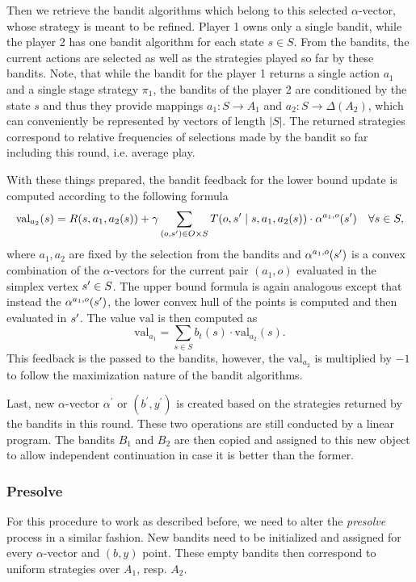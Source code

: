\documentclass[../main.tex]{subfiles}
\begin{document}
Then we retrieve the bandit algorithms which belong to this selected $\alpha$-vector, whose strategy is meant to be refined.
Player 1 owns only a single bandit, while the player 2 has one bandit algorithm for each state $s \in S$.
From the bandits, the current actions are selected as well as the strategies played so far by these bandits.
Note, that while the bandit for the player 1 returns a single action $a_1$ and a single stage strategy $\pi_1$, the bandits of the player 2 are conditioned by the state $s$ and thus they provide mappings $a_1 : S \to A_1$ and $a_2 : S \to \Delta(A_2)$, which can conveniently be represented by vectors of length $|S|$.
The returned strategies correspond to relative frequencies of selections made by the bandit so far including this round, i.e. average play.

With these things prepared, the bandit feedback for the lower bound update is computed according to the following formula
\begin{equation}
    \text{val}_{a_2}(s) = R(s, a_1, a_2(s)) + \gamma \sum_{(o, s^{\prime}) \in O \times S}T(o, s^{\prime} \mid s, a_1, a_2(s)) \cdot \alpha^{a_1, o}(s^{\prime}) \quad \forall s \in S,
\end{equation}
where $a_1, a_2$ are fixed by the selection from the bandits and $\alpha^{a_1, o}(s^{\prime})$ is a convex combination of the $\alpha$-vectors for the current pair $(a_1, o)$ evaluated in the simplex vertex $s^{\prime} \in S$.
The upper bound formula is again analogous except that instead the $\alpha^{a_1, o}(s^{\prime})$, the lower convex hull of the points is computed and then evaluated in $s^{\prime}$.
The value $\text{val}$ is then computed as
\begin{equation}
    \text{val}_{a_1} = \sum_{s \in S} b_t(s) \cdot \text{val}_{a_2}(s).
\end{equation}
This feedback is the passed to the bandits, however, the $\text{val}_{a_2}$ is multiplied by $-1$ to follow the maximization nature of the bandit algorithms.

Last, new $\alpha$-vector $\alpha^{\prime}$ or $(b^{\prime}, y^{\prime})$ is created based on the strategies returned by the bandits in this round.
These two operations are still conducted by a linear program.
The bandits $B_1$ and $B_2$ are then copied and assigned to this new object to allow independent continuation in case it is better than the former.

\subsubsection{Presolve}
For this procedure to work as described before, we need to alter the \textit{presolve} process in a similar fashion.
New bandits need to be initialized and assigned for every $\alpha$-vector and $(b, y)$ point.
These empty bandits then correspond to uniform strategies over $A_1$, resp. $A_2$.
\end{document}

